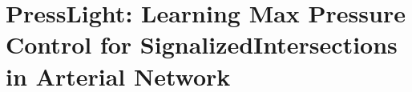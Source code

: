 \chapter{PressLight: Learning Max Pressure Control for SignalizedIntersections in Arterial Network}
\label{chap:presslight}